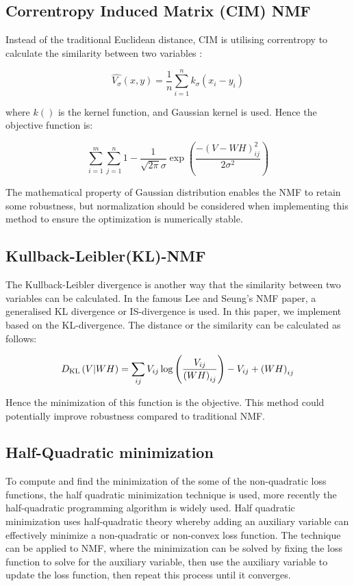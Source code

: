 \documentclass{article} %
\begin{document}
\subsection{Correntropy Induced Matrix (CIM) NMF}
Instead of the traditional Euclidean distance, CIM is utilising correntropy to calculate the similarity between two variables \cite{liu-pokharel-principe}:

\begin{equation}
\hat{V_\sigma}\left(x,y\right) = \frac{1}{n}\sum_{i=1}^{n}k_\sigma\left(x_i - y_i\right)
\end{equation}

where $k\left(\right)$ is the kernel function, and Gaussian kernel is used. Hence the objective function is:

\begin{equation}
\sum_{i=1}^{m}\sum_{j=1}^{n} 1 - \frac{1}{\sqrt{2\pi}\sigma}\exp\left(\frac{-\left(V - WH\right)_{ij}^2}{2\sigma^2}\right)
\end{equation}

The mathematical property of Gaussian distribution enables the NMF to retain some robustness, but normalization should be considered when implementing this method to ensure the optimization is numerically stable. \cite{du-li-shen}

\subsection{Kullback-Leibler(KL)-NMF}
The Kullback-Leibler divergence is another way that the similarity between two variables can be calculated. \cite{fevotte-idier} In the famous Lee and Seung’s NMF paper, a generalised KL divergence or IS-divergence is used. In this paper, we implement based on the KL-divergence. The distance or the similarity can be calculated as follows:

\begin{equation}
D_{\textup{KL}}\left(V|WH\right) = \sum_{ij}V_{ij} \log\left(\frac{V_{ij}}{\left(WH\right)_{ij}}\right) - V_{ij} + \left(WH\right)_{ij}
\end{equation}

Hence the minimization of this function is the objective. This method could potentially improve robustness compared to traditional NMF. \cite{finesso-spreij}

\subsection{Half-Quadratic minimization}
To compute and find the minimization of the some of the non-quadratic loss functions, the half quadratic minimization technique is used, more recently the half-quadratic programming algorithm is widely used. \cite{geman-chengda} Half quadratic minimization uses half-quadratic theory \cite{nikolova-chan} whereby adding an auxiliary variable can effectively minimize a non-quadratic or non-convex loss function. The technique can be applied to NMF, where the minimization can be solved by fixing the loss function to solve for the auxiliary variable, then use the auxiliary variable to update the loss function, then repeat this process until it converges. \cite{du-li-shen}
\end{document}
